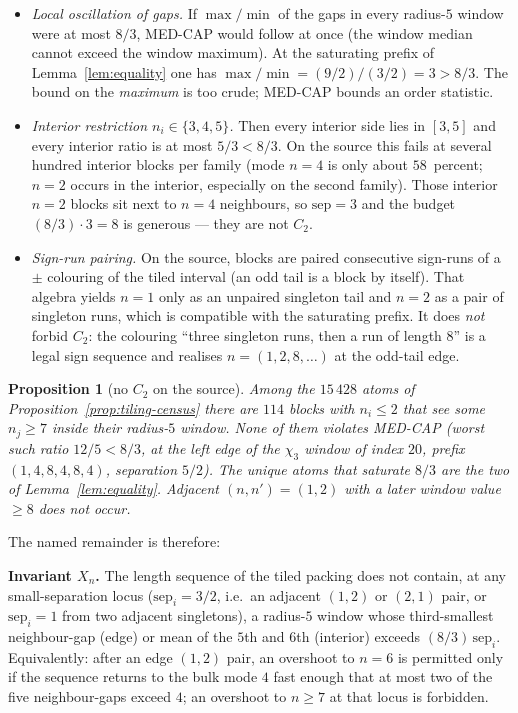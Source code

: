 \documentclass[11pt]{article}
\newtheorem{prop}{Proposition}
\theoremstyle{remark}
\begin{document}
\begin{itemize}
\item \emph{Local oscillation of gaps.}
If $\max/\min$ of the gaps in every radius-$5$ window were at most
$8/3$, MED-CAP would follow at once (the window median cannot
exceed the window maximum).  At the saturating prefix of
Lemma~\ref{lem:equality} one has $\max/\min=(9/2)/(3/2)=3>8/3$.
The bound on the \emph{maximum} is too crude; MED-CAP bounds an
order statistic.
\item \emph{Interior restriction $n_i\in\{3,4,5\}$.}
Then every interior side lies in $[3,5]$ and every interior ratio
is at most $5/3<8/3$.  On the source this fails at several hundred
interior blocks per family (mode $n=4$ is only about $58$~percent;
$n=2$ occurs in the interior, especially on the second family).
Those interior $n=2$ blocks sit next to $n=4$ neighbours, so
$\mathrm{sep}=3$ and the budget $(8/3)\cdot 3=8$ is generous ---
they are not $C_2$.
\item \emph{Sign-run pairing.}
On the source, blocks are paired consecutive sign-runs of a
$\pm$ colouring of the tiled interval (an odd tail is a block by
itself).  That algebra yields $n=1$ only as an unpaired singleton
tail and $n=2$ as a pair of singleton runs, which is compatible
with the saturating prefix.  It does \emph{not} forbid $C_2$: the
colouring ``three singleton runs, then a run of length $8$'' is a
legal sign sequence and realises $n=(1,2,8,\dots)$ at the odd-tail
edge.
\end{itemize}

\begin{prop}[no $C_2$ on the source]\label{prop:no-c2}
Among the $15\,428$ atoms of Proposition~\ref{prop:tiling-census}
there are $114$ blocks with $n_i\le 2$ that see some $n_j\ge 7$
inside their radius-$5$ window.  None of them violates MED-CAP
(worst such ratio $12/5<8/3$, at the left edge of the $\chi_3$
window of index $20$, prefix $(1,4,8,4,8,4)$, separation $5/2$).
The unique atoms that saturate $8/3$ are the two of
Lemma~\ref{lem:equality}.  Adjacent $(n,n')=(1,2)$ with a later
window value $\ge 8$ does not occur.
\end{prop}

The named remainder is therefore:

\medskip
\noindent\textbf{Invariant $X_n$.}\enspace
The length sequence of the tiled packing does not contain, at any
small-separation locus ($\mathrm{sep}_i=3/2$, i.e.\ an adjacent
$(1,2)$ or $(2,1)$ pair, or $\mathrm{sep}_i=1$ from two adjacent
singletons), a radius-$5$ window whose third-smallest neighbour-gap
(edge) or mean of the $5$th and $6$th (interior) exceeds
$(8/3)\,\mathrm{sep}_i$.  Equivalently: after an edge $(1,2)$ pair,
an overshoot to $n=6$ is permitted only if the sequence returns to
the bulk mode $4$ fast enough that at most two of the five
neighbour-gaps exceed $4$; an overshoot to $n\ge 7$ at that locus
is forbidden.
\end{document}
